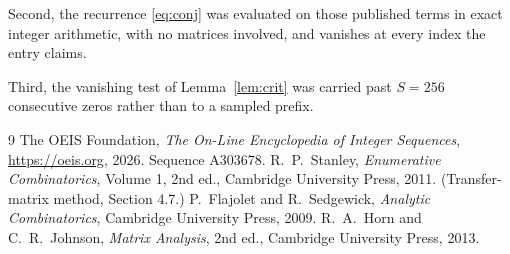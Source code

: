 \documentclass[11pt,a4paper]{article}
\theoremstyle{plain}
\theoremstyle{definition}
\begin{document}
Second, the recurrence \eqref{eq:conj} was evaluated on those published terms in exact
integer arithmetic, with no matrices involved, and vanishes at every index the entry claims.

Third, the vanishing test of Lemma~\ref{lem:crit} was carried past $S=256$ consecutive
zeros rather than to a sampled prefix.

\begin{thebibliography}{9}
 The OEIS Foundation, \emph{The On-Line Encyclopedia of Integer
Sequences}, \url{https://oeis.org}, 2026. Sequence A303678.
 R.~P.~Stanley, \emph{Enumerative Combinatorics}, Volume 1, 2nd ed.,
Cambridge University Press, 2011. (Transfer-matrix method, Section 4.7.)
 P.~Flajolet and R.~Sedgewick, \emph{Analytic Combinatorics}, Cambridge
University Press, 2009.
 R.~A.~Horn and C.~R.~Johnson, \emph{Matrix Analysis}, 2nd ed., Cambridge
University Press, 2013.
\end{thebibliography}
\end{document}
